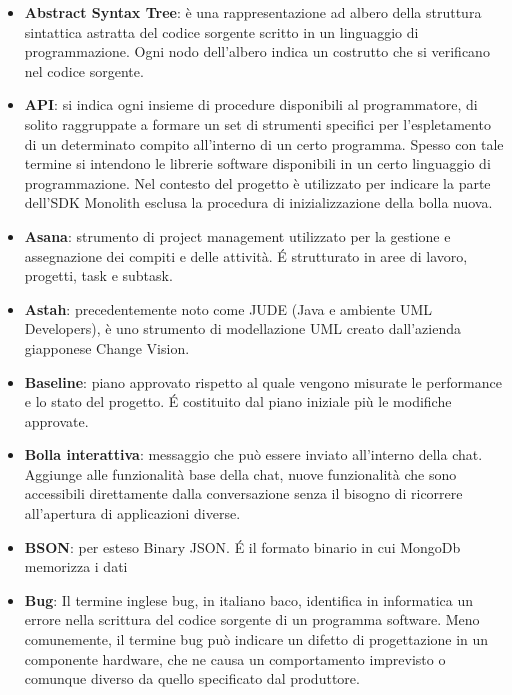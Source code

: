 \begin{itemize}
\item[] \textbf{Abstract Syntax Tree}: è una rappresentazione ad albero della struttura sintattica astratta del codice sorgente scritto in un linguaggio di programmazione. Ogni nodo dell'albero indica un costrutto che si verificano nel codice sorgente.
\item[] \textbf{API}: si indica ogni insieme di procedure disponibili al programmatore, di solito raggruppate a formare un set di strumenti specifici per l'espletamento di un determinato compito all'interno di un certo programma. Spesso con tale termine si intendono le librerie software disponibili in un certo linguaggio di programmazione. Nel contesto del progetto è utilizzato per indicare la parte dell'SDK Monolith esclusa la procedura di inizializzazione della bolla nuova.
\item[] \textbf{Asana}: strumento di project management utilizzato per la gestione e assegnazione dei compiti e delle attività. \'E strutturato in aree di lavoro, progetti, task e subtask.
\item[] \textbf{Astah}: precedentemente noto come JUDE (Java e ambiente UML Developers), è uno strumento di modellazione UML creato dall'azienda giapponese Change Vision.
\end{itemize}
\newpage

\begin{itemize}
\item[] \textbf{Baseline}: piano approvato rispetto al quale vengono misurate le performance e lo stato del progetto. \'E costituito dal piano iniziale più le modifiche approvate.
\item[] \textbf{Bolla interattiva}: messaggio che può essere inviato all'interno della chat. Aggiunge alle funzionalità base della chat, nuove funzionalità che sono accessibili direttamente dalla conversazione senza il bisogno di ricorrere all'apertura di applicazioni diverse.
\item[] \textbf{BSON}: per esteso Binary JSON. \'E il formato binario in cui MongoDb memorizza i dati
\item[] \textbf{Bug}: Il termine inglese bug, in italiano baco, identifica in informatica un errore nella scrittura del codice sorgente di un programma software. Meno comunemente, il termine bug può indicare un difetto di progettazione in un componente hardware, che ne causa un comportamento imprevisto o comunque diverso da quello specificato dal produttore.
\end{itemize}
\newpage

